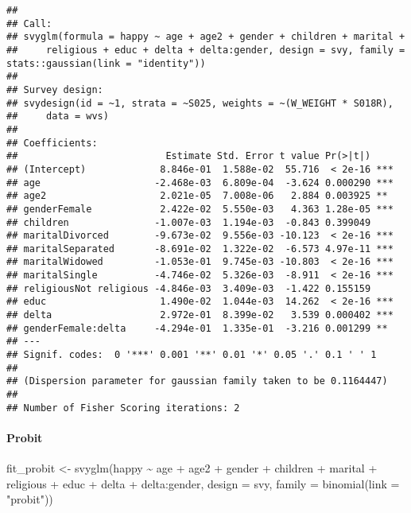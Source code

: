 \documentclass[
]{article}
\newenvironment{Shaded}{\begin{snugshade}}{\end{snugshade}}
\newcommand{\AttributeTok}[1]{\textcolor[rgb]{0.77,0.63,0.00}{#1}}
\newcommand{\FunctionTok}[1]{\textcolor[rgb]{0.00,0.00,0.00}{#1}}
\newcommand{\NormalTok}[1]{#1}
\newcommand{\OtherTok}[1]{\textcolor[rgb]{0.56,0.35,0.01}{#1}}
\newcommand{\SpecialCharTok}[1]{\textcolor[rgb]{0.00,0.00,0.00}{#1}}
\newcommand{\StringTok}[1]{\textcolor[rgb]{0.31,0.60,0.02}{#1}}
\begin{document}
\begin{verbatim}
## 
## Call:
## svyglm(formula = happy ~ age + age2 + gender + children + marital + 
##     religious + educ + delta + delta:gender, design = svy, family = stats::gaussian(link = "identity"))
## 
## Survey design:
## svydesign(id = ~1, strata = ~S025, weights = ~(W_WEIGHT * S018R), 
##     data = wvs)
## 
## Coefficients:
##                          Estimate Std. Error t value Pr(>|t|)    
## (Intercept)             8.846e-01  1.588e-02  55.716  < 2e-16 ***
## age                    -2.468e-03  6.809e-04  -3.624 0.000290 ***
## age2                    2.021e-05  7.008e-06   2.884 0.003925 ** 
## genderFemale            2.422e-02  5.550e-03   4.363 1.28e-05 ***
## children               -1.007e-03  1.194e-03  -0.843 0.399049    
## maritalDivorced        -9.673e-02  9.556e-03 -10.123  < 2e-16 ***
## maritalSeparated       -8.691e-02  1.322e-02  -6.573 4.97e-11 ***
## maritalWidowed         -1.053e-01  9.745e-03 -10.803  < 2e-16 ***
## maritalSingle          -4.746e-02  5.326e-03  -8.911  < 2e-16 ***
## religiousNot religious -4.846e-03  3.409e-03  -1.422 0.155159    
## educ                    1.490e-02  1.044e-03  14.262  < 2e-16 ***
## delta                   2.972e-01  8.399e-02   3.539 0.000402 ***
## genderFemale:delta     -4.294e-01  1.335e-01  -3.216 0.001299 ** 
## ---
## Signif. codes:  0 '***' 0.001 '**' 0.01 '*' 0.05 '.' 0.1 ' ' 1
## 
## (Dispersion parameter for gaussian family taken to be 0.1164447)
## 
## Number of Fisher Scoring iterations: 2
\end{verbatim}

\hypertarget{probit}{%
\paragraph{Probit}\label{probit}}

\begin{Shaded}
\begin{Highlighting}[]
\NormalTok{fit\_probit }\OtherTok{\textless{}{-}} \FunctionTok{svyglm}\NormalTok{(happy }\SpecialCharTok{\textasciitilde{}}\NormalTok{ age }\SpecialCharTok{+}\NormalTok{ age2 }\SpecialCharTok{+}\NormalTok{ gender }\SpecialCharTok{+}\NormalTok{ children }\SpecialCharTok{+}\NormalTok{ marital }\SpecialCharTok{+}\NormalTok{ religious }\SpecialCharTok{+}\NormalTok{ educ }\SpecialCharTok{+}
\NormalTok{                       delta }\SpecialCharTok{+}\NormalTok{ delta}\SpecialCharTok{:}\NormalTok{gender,}
                     \AttributeTok{design =}\NormalTok{ svy,}
                     \AttributeTok{family =} \FunctionTok{binomial}\NormalTok{(}\AttributeTok{link =} \StringTok{"probit"}\NormalTok{))}
\end{Highlighting}
\end{Shaded}
\end{document}

